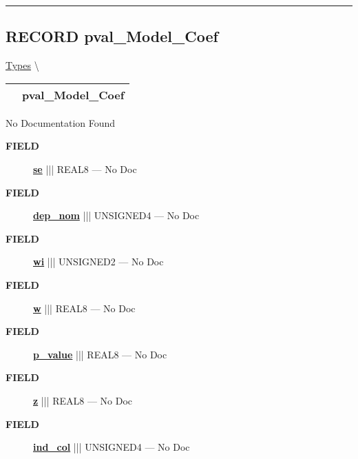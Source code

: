 \rule{\linewidth}{0.5pt}
\subsection*{\textsf{\colorbox{headtoc}{\color{white} RECORD}
pval\_Model\_Coef}}

\hypertarget{ecldoc:logisticregression.types.pval_model_coef}{}
\hspace{0pt} \hyperlink{ecldoc:LogisticRegression.Types}{Types} \textbackslash 

{\renewcommand{\arraystretch}{1.5}
\begin{tabularx}{\textwidth}{|>{\raggedright\arraybackslash}l|X|}
\hline
\hspace{0pt}\mytexttt{\color{red} } & \textbf{pval\_Model\_Coef} \\
\hline
\end{tabularx}
}

\par





No Documentation Found







\par
\begin{description}
\item [\colorbox{tagtype}{\color{white} \textbf{\textsf{FIELD}}}] \textbf{\underline{se}} ||| REAL8 --- No Doc
\item [\colorbox{tagtype}{\color{white} \textbf{\textsf{FIELD}}}] \textbf{\underline{dep\_nom}} ||| UNSIGNED4 --- No Doc
\item [\colorbox{tagtype}{\color{white} \textbf{\textsf{FIELD}}}] \textbf{\underline{wi}} ||| UNSIGNED2 --- No Doc
\item [\colorbox{tagtype}{\color{white} \textbf{\textsf{FIELD}}}] \textbf{\underline{w}} ||| REAL8 --- No Doc
\item [\colorbox{tagtype}{\color{white} \textbf{\textsf{FIELD}}}] \textbf{\underline{p\_value}} ||| REAL8 --- No Doc
\item [\colorbox{tagtype}{\color{white} \textbf{\textsf{FIELD}}}] \textbf{\underline{z}} ||| REAL8 --- No Doc
\item [\colorbox{tagtype}{\color{white} \textbf{\textsf{FIELD}}}] \textbf{\underline{ind\_col}} ||| UNSIGNED4 --- No Doc
\end{description}





